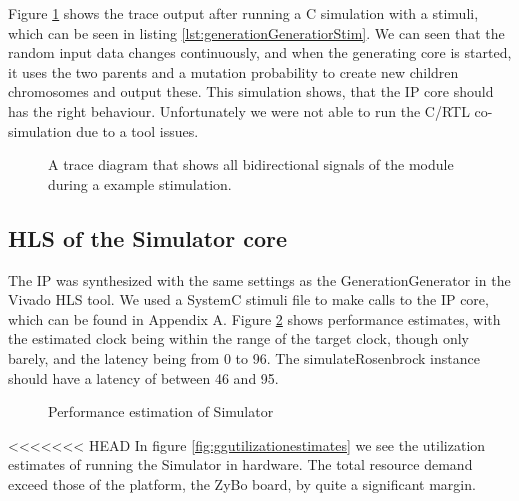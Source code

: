 Figure \ref{fig:generationgeneratortrace} shows the trace output after running a C simulation with a stimuli, which can be seen in listing \ref{lst:generationGeneratiorStim}. We can seen that the random input data changes continuously, and when the generating core is started, it uses the two parents and a mutation probability to create new children chromosomes and output these. This simulation shows, that the IP core should has the right behaviour. Unfortunately we were not able to run the C/RTL co-simulation  due to a tool issues.

\begin{figure}[h!]
	\centering
	\caption{A trace diagram that shows all bidirectional signals of the module during a example stimulation.}
	\label{fig:generationgeneratortrace}
\end{figure}
\FloatBarrier

\subsection{HLS of the Simulator core}

The IP was synthesized with the same settings as the GenerationGenerator in the Vivado HLS tool. We used a SystemC stimuli file to make calls to the IP core, which can be found in Appendix A. Figure \ref{fig:simperformanceestimates} shows performance estimates, with the estimated clock being within the range of the target clock, though only barely, and the latency being from  0 to 96. The simulateRosenbrock instance should have a latency of between 46 and 95. 

\begin{figure}[h!]
	\centering
	\caption{Performance estimation of Simulator}
	\label{fig:simperformanceestimates}
\end{figure}
\FloatBarrier
<<<<<<< HEAD
In figure \ref{fig:ggutilizationestimates} we see the utilization estimates of running the Simulator in hardware. The total resource demand exceed those of the platform, the ZyBo board, by quite a significant margin. 

